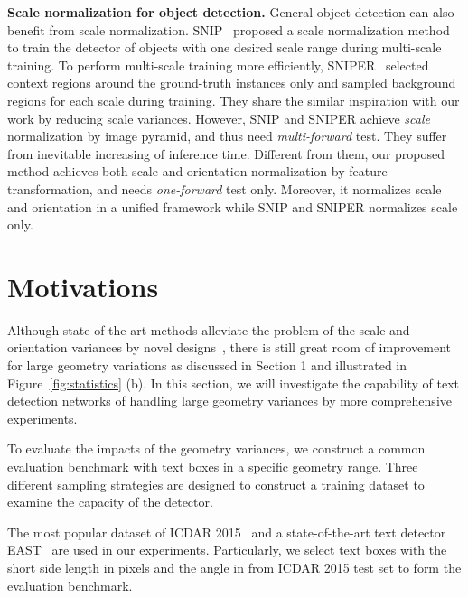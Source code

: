 \documentclass[10pt,twocolumn,letterpaper]{article}
\begin{document}
 \textbf{Scale normalization for object detection.} General object detection can also benefit from scale normalization. SNIP~\cite{singh2018analysis} proposed a scale normalization method to train the detector of objects with one desired scale range during multi-scale training. To perform multi-scale training more efficiently, SNIPER~\cite{Singh2018} selected context regions around the ground-truth instances only and sampled background regions for each scale during training. They share the similar inspiration with our work by reducing scale variances. However, SNIP and SNIPER achieve \textit{scale} normalization by image pyramid, and thus need \textit{multi-forward} test. They suffer from inevitable increasing of inference time. Different from them, our proposed method achieves both scale and orientation normalization by feature transformation, and needs \textit{one-forward} test only. Moreover, it normalizes scale and orientation in a unified framework while SNIP and SNIPER normalizes scale only.







\section{Motivations}



Although state-of-the-art methods alleviate the problem of the scale and orientation variances by novel designs~\cite{Zhou2017, liao2018rotation, wang2018geometry}, there is still great room of improvement for large geometry variations as discussed in Section 1 and illustrated in Figure~\ref{fig:statistics} (b). In this section, we will investigate the capability of text detection networks of handling large geometry variances by more comprehensive experiments.

To evaluate the impacts of the geometry variances, we construct a common evaluation benchmark with text boxes in a specific geometry range. Three different sampling strategies are designed to construct a training dataset to examine the capacity of the detector.

The most popular dataset of ICDAR 2015~\cite{karatzas2015icdar} and a state-of-the-art text detector EAST~\cite{Zhou2017} are used in our experiments.
Particularly, we select text boxes with the short side length in  pixels and the angle in  from ICDAR 2015 test set to form the evaluation benchmark.
\end{document}
